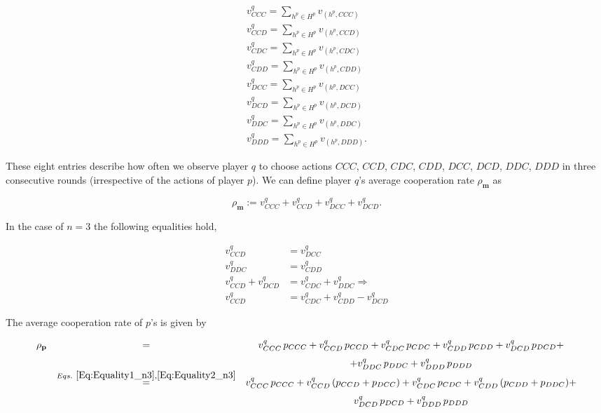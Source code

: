 \documentclass{article}
\theoremstyle{definition}
\begin{document}
\begin{equation}
\begin{array}{l}
\displaystyle v^q_{CCC} = \sum_{h^p\in H^p} v_{(h^p,CCC)}\\
\displaystyle v^q_{CCD} = \sum_{h^p\in H^p} v_{(h^p,CCD)}\\
\displaystyle v^q_{CDC} = \sum_{h^p\in H^p} v_{(h^p,CDC)}\\
\displaystyle v^q_{CDD} = \sum_{h^p\in H^p} v_{(h^p,CDD)}\\
\displaystyle v^q_{DCC} = \sum_{h^p\in H^p} v_{(h^p,DCC)}\\
\displaystyle v^q_{DCD} = \sum_{h^p\in H^p} v_{(h^p,DCD)}\\
\displaystyle v^q_{DDC} = \sum_{h^p\in H^p} v_{(h^p,DDC)}\\
\displaystyle v^q_{DDD} = \sum_{h^p\in H^p} v_{(h^p,DDD)}.
\end{array}
\end{equation}

These eight entries describe how often we observe player $q$ to choose actions
$CCC$, $CCD$, $CDC$, $CDD$, $DCC$, $DCD$, $DDC$, $DDD$ in three consecutive
rounds (irrespective of the actions of player $p$). We can define player $q$'s
average cooperation rate $\rho_\mathbf{m}$ as 

\begin{equation} \label{Eq:rhoq_n3}
\rho_\mathbf{m} := v^q_{CCC} + v^q_{CCD} + v^q_{DCC} + v^q_{DCD}.
\end{equation}

In the case of $n=3$ the following equalities hold,

\begin{align} 
  v^{q}_{CCD} & = v^{q}_{DCC} \label{Eq:Equality1_n3} \\ 
  v^{q}_{DDC} & = v^{q}_{CDD} \label{Eq:Equality2_n3} \\  
  v^{q}_{CCD} + v^{q}_{DCD}  & = v^{q}_{CDC} + v^{q}_{DDC} \Rightarrow \nonumber \\ 
  v^{q}_{CCD} & = v^{q}_{CDC} + v^{q}_{CDD} - v^{q}_{DCD} \label{Eq:Equality3_n3} 
\end{align}

The average cooperation rate of $p$'s is given by

\begin{equation}\label{Eq:rhop_n3}
  \begin{array}{rcc}
  \rho_\mathbf{p} & = & \displaystyle v^q_{CCC}\, p_{CCC}+ v^q_{CCD}\, p_{CCD} + v^q_{CDC}\, p_{CDC} + v^q_{CDD}\, p_{CDD} + v^q_{DCD}\, p_{DCD} +  \\ [.7em]
  & & + v^q_{DDC}\, p_{DDC} + v^q_{DDD}\, p_{DDD} \\
  & \stackrel{Eqs.~\eqref{Eq:Equality1_n3}, \eqref{Eq:Equality2_n3}}{=} & \displaystyle v^q_{CCC}\, p_{CCC}+ v^q_{CCD}\, (p_{CCD} + p_{DCC}) + v^q_{CDC}\, p_{CDC} + v^q_{CDD}\, (p_{CDD} + p_{DDC}) + \\ [.7em]
  & & v^q_{DCD}\, p_{DCD} + v^q_{DDD}\, p_{DDD}
  \end{array}
\end{equation}
 
\end{document}
